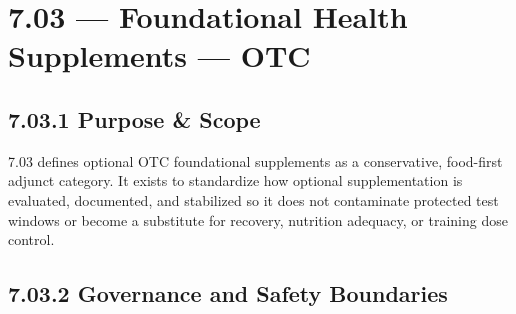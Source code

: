 \documentclass[10pt]{article}
\begin{document}
\section*{7.03 — Foundational Health Supplements — OTC}
{}

\subsection*{7.03.1 Purpose \& Scope}
{}

7.03 defines optional OTC foundational supplements as a conservative, food-first adjunct category. It exists to standardize how optional supplementation is evaluated, documented, and stabilized so it does not contaminate protected test windows or become a substitute for recovery, nutrition adequacy, or training dose control.

\subsection*{7.03.2 Governance and Safety Boundaries}
{}
\end{document}
